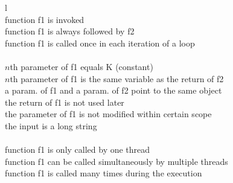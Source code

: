 \begin{table}[h!]
\scriptsize
\centering
{
\begin{tabular}{l}
\toprule
{}\\
  \midrule
    function f1 is invoked	\\
    function f1 is always followed by f2	\\
    function f1 is called once in each iteration of a loop\\
\midrule
{}\\
\midrule
     $n$th parameter of f1 equals K (constant) \\
     $n$th parameter of f1 is the same variable as the return of f2\\
     a param. of f1 and a param. of f2 point to the same object\\
     the return of f1 is not used later	\\
     the parameter of f1 is not modified within certain scope\\
     the input is a long string \\
\midrule
{}\\
\midrule
     function f1 is only called by one thread \\
     function f1 can be called simultaneously by multiple threads \\
     function f1 is called many times during the execution \\
\bottomrule
\end{tabular}
}
\caption{Typical conditions in function rules}
\label{tab:4_rule}
\end{table}
